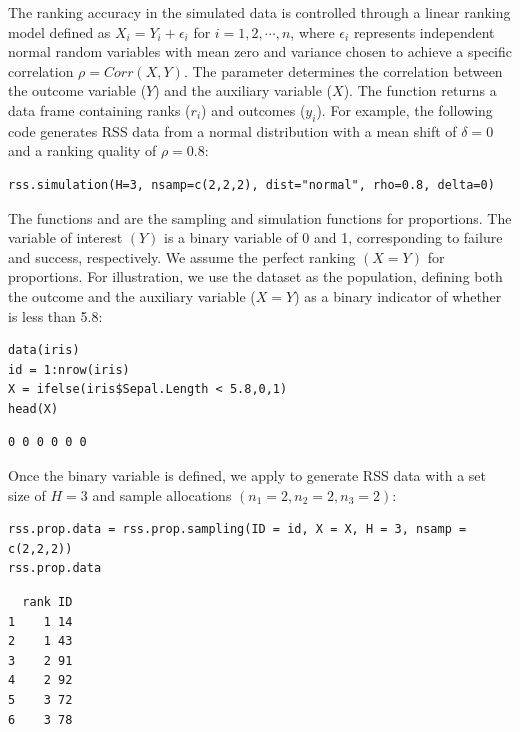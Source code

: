 The ranking accuracy in the simulated data is controlled through a linear ranking model defined as $X_i=Y_i+\epsilon_i$ for $i=1,2,\cdots,n$, where $\epsilon_i$ represents independent normal random variables with mean zero and variance chosen to achieve a specific correlation $\rho=Corr(X, Y)$. The  parameter determines the correlation between the outcome variable ($Y$) and the auxiliary variable ($X$).  The function returns a data frame containing ranks ($r_i$) and outcomes ($y_i$). For example, the following code generates RSS data from a normal distribution with a mean shift of $\delta=0$ and a ranking quality of $\rho=0.8$:
\begin{verbatim}
rss.simulation(H=3, nsamp=c(2,2,2), dist="normal", rho=0.8, delta=0)
\end{verbatim}    
%
The functions  and  are the sampling and simulation functions for proportions. The variable of interest $(Y)$ is a binary variable of 0 and 1, corresponding to failure and success, respectively. We assume the perfect ranking $(X=Y)$ for proportions. For illustration, we use the  dataset as the population, defining both the outcome and the auxiliary variable ($X=Y$) as a binary indicator of whether  is less than 5.8:
%

\begin{verbatim}
data(iris)
id = 1:nrow(iris)
X = ifelse(iris$Sepal.Length < 5.8,0,1)
head(X)
\end{verbatim}
\begin{verbatim}
0 0 0 0 0 0
\end{verbatim}

%
Once the binary variable is defined, we apply  to generate RSS data with a set size of $H=3$ and sample allocations $(n_1=2, n_2=2, n_3=2)$:
%

\begin{verbatim}
rss.prop.data = rss.prop.sampling(ID = id, X = X, H = 3, nsamp = c(2,2,2))
rss.prop.data
\end{verbatim}
\begin{verbatim}
  rank ID
1    1 14
2    1 43
3    2 91
4    2 92
5    3 72
6    3 78
\end{verbatim}

